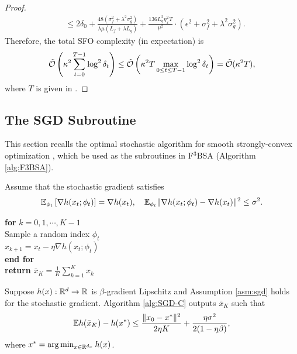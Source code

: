 {\begin{proof}
\begin{align*}
    &\le 2\delta_0 + \frac{48 (\sigma_f^2+ \lambda^2 \sigma_g^2)}{\lambda \mu (L_f + \lambda L_g)} + \frac{136 L_g^2 \eta_x^2 T}{\mu^2} \cdot \left( \epsilon^2 + \sigma_f^2 + \lambda^2 \sigma_g^2 \right).
\end{align*}
Therefore, the total SFO complexity (in expectation) is
\begin{align*}
    \tilde {{\mathcal{O}}} \left( \kappa^2 \sum_{t=0}^{T-1} \log^2 \delta_t \right) \le \tilde {{\mathcal{O}}} \left( \kappa^2 T \max_{ 0 \le t \le T-1} \log^2 \delta_t \right) = \tilde {{\mathcal{O}}}(\kappa^2 T),
\end{align*}
where $T$ is given in .
\end{proof}

\subsection{The SGD Subroutine} \label{apx:SGD-SC}


This section recalls the optimal stochastic algorithm for smooth strongly-convex optimization \citep{allen2018make}, which be used as the subroutines in F${}^3$BSA (Algorithm \ref{alg:F3BSA}). 

\begin{asm} \label{asm:sgd}
Assume that the stochastic gradient satisfies 
\begin{align*}
    {\mathbb{E}}_{\phi_t} \left[ \nabla h(x_t;\phi_t) \right] = \nabla h(x_t) , \quad {\mathbb{E}}_{\phi_t} \Vert \nabla h(x_t;\phi_t) - \nabla h(x_t) \Vert^2 \le \sigma^2.
\end{align*}
\end{asm}

\begin{algorithm*}[htbp]  
\caption{SGD $(h, x_0, \eta, K)$} \label{alg:SGD-C}
\begin{algorithmic}[1] 
\STATE \textbf{for} $k = 0,1,\cdots,K-1$ \\
\STATE \quad Sample a random index $\phi_t$ \\[1mm]
\STATE \quad $x_{k+1} = x_t - \eta \nabla h(x_t ; \phi_t)$ \\[1mm]
\STATE \textbf{end for} \\[1mm]
\STATE \textbf{return} $\bar x_K = \frac{1}{K} \sum_{k=1}^K x_k$  
\end{algorithmic}
\end{algorithm*}

\begin{thm}{\citet[Theorem 4.1 (a)]{allen2018make}}
\label{thm:SGD-C}
Suppose $h(x): {\mathbb{R}}^d \rightarrow {\mathbb{R}}$ is  $\beta$-gradient Lipschitz and Assumption \ref{asm:sgd} holds for the stochastic gradient. Algorithm \ref{alg:SGD-C} outputs $\bar x_K$ such that
\begin{align*}
    {\mathbb{E}} h(\bar x_K)  - h(x^*) \le \frac{\Vert x_0 -x^* \Vert^2}{2\eta K} +  \frac{\eta \sigma^2}{2 (1- \eta \beta)},
\end{align*}
where $x^* = \arg \min_{x \in {\mathbb{R}}^{d_x}} h(x)$.


\end{thm}}
